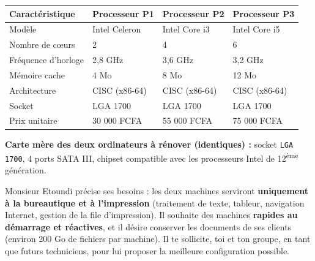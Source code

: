 \documentclass[11pt]{article}
\begin{document}
\begin{experience}
\begin{center}
\begin{tabularx}{\linewidth}{|l|X|X|X|}
\hline
\rowcolor{popblueL} \textbf{Caractéristique} & \textbf{Processeur P1} & \textbf{Processeur P2} & \textbf{Processeur P3} \\
\hline
Modèle & Intel Celeron & Intel Core i3 & Intel Core i5 \\
\hline
Nombre de cœurs & 2 & 4 & 6 \\
\hline
Fréquence d'horloge & 2,8 GHz & 3,6 GHz & 3,2 GHz \\
\hline
Mémoire cache & 4 Mo & 8 Mo & 12 Mo \\
\hline
Architecture & CISC (x86-64) & CISC (x86-64) & CISC (x86-64) \\
\hline
Socket & LGA 1700 & LGA 1700 & LGA 1700 \\
\hline
Prix unitaire & 30 000 FCFA & 55 000 FCFA & 75 000 FCFA \\
\hline
\end{tabularx}
\end{center}

\textbf{Carte mère des deux ordinateurs à rénover (identiques) :} socket \texttt{LGA 1700}, 4 ports SATA III, chipset compatible avec les processeurs Intel de 12\textsuperscript{ème} génération.

Monsieur Etoundi précise ses besoins : les deux machines serviront \textbf{uniquement à la bureautique et à l'impression} (traitement de texte, tableur, navigation Internet, gestion de la file d'impression). Il souhaite des machines \textbf{rapides au démarrage et réactives}, et il désire conserver les documents de ses clients (environ 200 Go de fichiers par machine). Il te sollicite, toi et ton groupe, en tant que futurs techniciens, pour lui proposer la meilleure configuration possible.


\end{experience}
\end{document}
